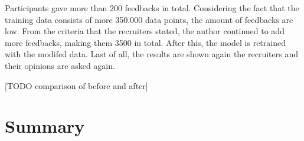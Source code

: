 Participants gave more than 200 feedbacks in total. Considering the fact that the training data consists of more 350.000 data points, the amount of feedbacks are low. From the criteria that the recruiters stated, the author continued to add more feedbacks, making them 3500 in total. After this, the model is retrained with the modifed data. Last of all, the results are shown again the recruiters and their opinions are asked again.

[TODO comparison of before and after]

\section{Summary}


